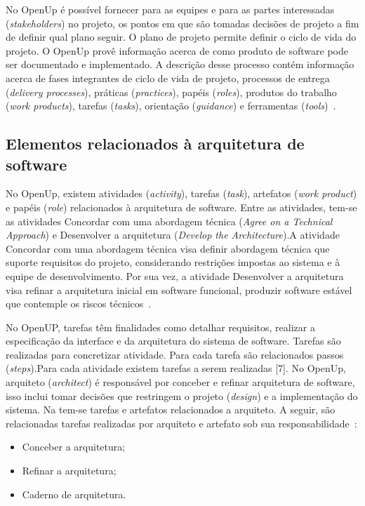 No OpenUp é possível fornecer para as equipes e para as partes interessadas (\emph{stakeholders}) no projeto, os pontos em que são tomadas decisões de projeto a fim de definir qual plano seguir. O plano de projeto permite definir o ciclo de vida do projeto. O OpenUp provê informação acerca de como produto de software pode ser documentado e implementado. A descrição desse processo contém informação acerca de fases integrantes de ciclo de vida de projeto, processos de entrega (\emph{delivery processes}), práticas (\emph{practices}), papéis (\emph{roles}), produtos do trabalho (\emph{work products}), tarefas (\emph{tasks}), orientação (\emph{guidance}) e ferramentas (\emph{tools})~\cite{openup}.

\subsection{Elementos relacionados à arquitetura de software}

No OpenUp, existem atividades (\emph{activity}), tarefas (\emph{task}), artefatos (\emph{work product}) e papéis (\emph{role}) relacionados à arquitetura de software. Entre as atividades, tem-se as atividades Concordar com uma abordagem técnica (\emph{Agree on a Technical Approach}) e Desenvolver a arquitetura (\emph{Develop the Architecture}).A atividade Concordar com uma abordagem técnica visa definir abordagem técnica que suporte requisitos do projeto, considerando restrições impostas ao sistema e à equipe de desenvolvimento. Por sua vez, a atividade Desenvolver a arquitetura visa refinar a arquitetura inicial em software funcional, produzir software estável que contemple os riscos técnicos~\cite{openup}.

No OpenUP, tarefas têm finalidades como detalhar requisitos, realizar a especificação da interface e da arquitetura do sistema de software. Tarefas são realizadas para concretizar atividade. Para cada tarefa são relacionados passos (\emph{steps}).Para cada atividade existem tarefas a serem realizadas [7]. No OpenUp, arquiteto (\emph{architect}) é responsável por conceber e refinar arquitetura de software, isso inclui tomar decisões que restringem o projeto (\emph{design}) e a implementação do sistema. Na  tem-se tarefas e artefatos relacionados a arquiteto. A seguir, são relacionadas tarefas realizadas por arquiteto e artefato sob sua responsabilidade~\cite{openup}: 


\begin{itemize}
    \item Conceber a arquitetura;
    \item Refinar a arquitetura;
    \item Caderno de arquitetura.
\end{itemize} 


